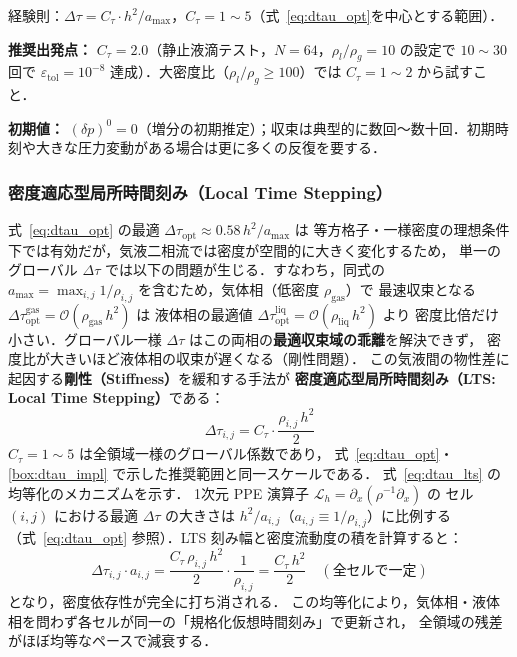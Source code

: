 \label{box:dtau_impl}
経験則：$\Delta\tau = C_\tau \cdot h^2/a_{\max}$，$C_\tau = 1 \sim 5$（式~\eqref{eq:dtau_opt}を中心とする範囲）．

\textbf{推奨出発点：} $C_\tau = 2.0$（静止液滴テスト，$N=64$，$\rho_l/\rho_g=10$ の設定で $10\sim30$ 回で $\varepsilon_\text{tol}=10^{-8}$ 達成）．大密度比（$\rho_l/\rho_g \geq 100$）では $C_\tau=1\sim2$ から試すこと．

\textbf{初期値：} $(\delta p)^0 = 0$（増分の初期推定）；収束は典型的に数回〜数十回．初期時刻や大きな圧力変動がある場合は更に多くの反復を要する．

\subsubsection{密度適応型局所時間刻み（Local Time Stepping）}
\label{sec:lts_dtau}

式~\eqref{eq:dtau_opt} の最適 $\Delta\tau_\mathrm{opt} \approx 0.58\,h^2/a_\mathrm{max}$ は
等方格子・一様密度の理想条件下では有効だが，気液二相流では密度が空間的に大きく変化するため，
単一のグローバル $\Delta\tau$ では以下の問題が生じる．すなわち，同式の
$a_\mathrm{max} = \max_{i,j} 1/\rho_{i,j}$ を含むため，気体相（低密度 $\rho_\mathrm{gas}$）で
最速収束となる $\Delta\tau_\mathrm{opt}^\mathrm{gas} = \mathcal{O}(\rho_\mathrm{gas}\,h^2)$ は
液体相の最適値 $\Delta\tau_\mathrm{opt}^\mathrm{liq} = \mathcal{O}(\rho_\mathrm{liq}\,h^2)$ より
密度比倍だけ小さい．グローバル一様 $\Delta\tau$ はこの両相の\textbf{最適収束域の乖離}を解決できず，
密度比が大きいほど液体相の収束が遅くなる（剛性問題）．
この気液間の物性差に起因する\textbf{剛性（Stiffness）}を緩和する手法が
\textbf{密度適応型局所時間刻み（LTS: Local Time Stepping）}である：
\begin{equation}
  \Delta\tau_{i,j} = C_\tau \cdot \frac{\rho_{i,j}\,h^2}{2}
  \label{eq:dtau_lts}
\end{equation}
$C_\tau = 1 \sim 5$ は全領域一様のグローバル係数であり，
式~\eqref{eq:dtau_opt}・\ref{box:dtau_impl} で示した推奨範囲と同一スケールである．
式~\eqref{eq:dtau_lts} の均等化のメカニズムを示す．
1次元 PPE 演算子 $\mathcal{L}_h = \partial_x(\rho^{-1}\partial_x)$ の
セル $(i,j)$ における最適 $\Delta\tau$ の大きさは $h^2/a_{i,j}$（$a_{i,j} \equiv 1/\rho_{i,j}$）に比例する
（式~\eqref{eq:dtau_opt} 参照）．LTS 刻み幅と密度流動度の積を計算すると：
\begin{equation*}
  \Delta\tau_{i,j} \cdot a_{i,j}
  = \frac{C_\tau\,\rho_{i,j}\,h^2}{2} \cdot \frac{1}{\rho_{i,j}}
  = \frac{C_\tau\,h^2}{2} \quad (\text{全セルで一定})
\end{equation*}
となり，密度依存性が完全に打ち消される．
この均等化により，気体相・液体相を問わず各セルが同一の「規格化仮想時間刻み」で更新され，
全領域の残差がほぼ均等なペースで減衰する．


